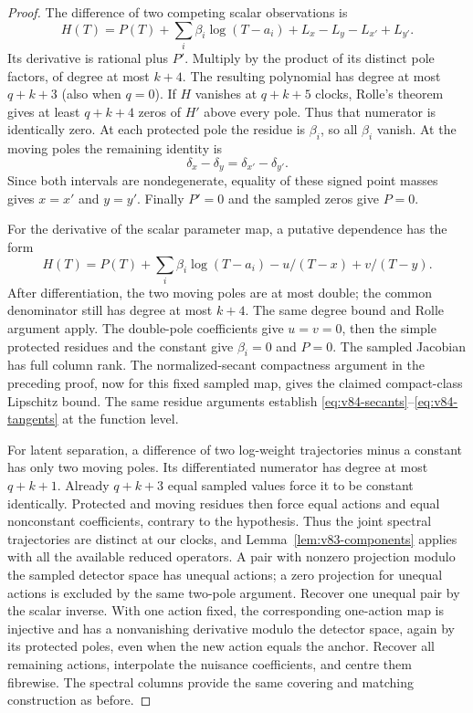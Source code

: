 \begin{proof}
The difference of two competing scalar observations is
\[
 H(T)=P(T)+\sum_i\beta_i\log(T-a_i)
             +L_x-L_y-L_{x'}+L_{y'}.
\]
Its derivative is rational plus $P'$. Multiply by the product of its
distinct pole factors, of degree at most $k+4$. The resulting
polynomial has degree at most $q+k+3$ (also when $q=0$). If $H$
vanishes at $q+k+5$ clocks, Rolle's theorem gives at least $q+k+4$
zeros of $H'$ above every pole. Thus that numerator is identically
zero. At each protected pole the residue is $\beta_i$, so all
$\beta_i$ vanish. At the moving poles the remaining identity is
\[
                  \delta_x-\delta_y=\delta_{x'}-\delta_{y'}.
\]
Since both intervals are nondegenerate, equality of these signed
point masses gives $x=x'$ and $y=y'$. Finally $P'=0$ and the sampled
zeros give $P=0$.

For the derivative of the scalar parameter map, a putative dependence
has the form
\[
 H(T)=P(T)+\sum_i\beta_i\log(T-a_i)
                         -u/(T-x)+v/(T-y).
\]
After differentiation, the two moving poles are at most double; the
common denominator still has degree at most $k+4$. The same degree
bound and Rolle argument apply. The double-pole coefficients give
$u=v=0$, then the simple protected residues and the constant give
$\beta_i=0$ and $P=0$. The sampled Jacobian has full column rank.
The normalized-secant compactness argument in the preceding proof,
now for this fixed sampled map, gives the claimed compact-class
Lipschitz bound. The same residue arguments establish
\eqref{eq:v84-secants}--\eqref{eq:v84-tangents} at the function level.

For latent separation, a difference of two log-weight trajectories
minus a constant has only two moving poles. Its differentiated
numerator has degree at most $q+k+1$. Already $q+k+3$ equal sampled
values force it to be constant identically. Protected and moving
residues then force equal actions and equal nonconstant coefficients,
contrary to the hypothesis. Thus the joint spectral trajectories are
distinct at our clocks, and Lemma~\ref{lem:v83-components} applies
with all the available reduced operators.
A pair with nonzero projection modulo the sampled detector space has
unequal actions; a zero projection for unequal actions is excluded by
the same two-pole argument. Recover one unequal pair by the scalar
inverse. With one action fixed, the corresponding one-action map is
injective and has a nonvanishing derivative modulo the detector space,
again by its protected poles, even when the new action equals the
anchor. Recover all remaining actions, interpolate the nuisance
coefficients, and centre them fibrewise. The spectral columns provide
the same covering and matching construction as before.
\end{proof}

